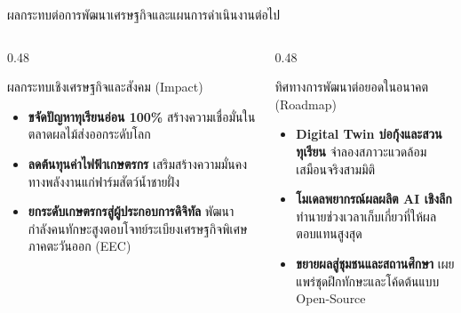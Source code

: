 \documentclass[aspectratio=169, 10pt]{beamer}
\begin{document}
\begin{frame}{ผลกระทบต่อการพัฒนาเศรษฐกิจและแผนการดำเนินงานต่อไป}
\begin{columns}[T]
    \begin{column}{0.48\textwidth}
        \begin{mastercard}{ผลกระทบเชิงเศรษฐกิจและสังคม (Impact)}
            \begin{itemize}
                \item \textbf{ขจัดปัญหาทุเรียนอ่อน 100\%} สร้างความเชื่อมั่นในตลาดผลไม้ส่งออกระดับโลก
                \item \textbf{ลดต้นทุนค่าไฟฟ้าเกษตรกร} เสริมสร้างความมั่นคงทางพลังงานแก่ฟาร์มสัตว์น้ำชายฝั่ง
                \item \textbf{ยกระดับเกษตรกรสู่ผู้ประกอบการดิจิทัล} พัฒนากำลังคนทักษะสูงตอบโจทย์ระเบียงเศรษฐกิจพิเศษภาคตะวันออก (EEC)
            \end{itemize}
        \end{mastercard}
    \end{column}
    \begin{column}{0.48\textwidth}
        \begin{goldcard}{ทิศทางการพัฒนาต่อยอดในอนาคต (Roadmap)}
            \begin{itemize}
                \item \textbf{Digital Twin บ่อกุ้งและสวนทุเรียน} จำลองสภาวะแวดล้อมเสมือนจริงสามมิติ
                \item \textbf{โมเดลพยากรณ์ผลผลิต AI เชิงลึก} ทำนายช่วงเวลาเก็บเกี่ยวที่ให้ผลตอบแทนสูงสุด
                \item \textbf{ขยายผลสู่ชุมชนและสถานศึกษา} เผยแพร่ชุดฝึกทักษะและโค้ดต้นแบบ Open-Source
            \end{itemize}
        \end{goldcard}
    \end{column}
\end{columns}
\end{frame}
\end{document}
